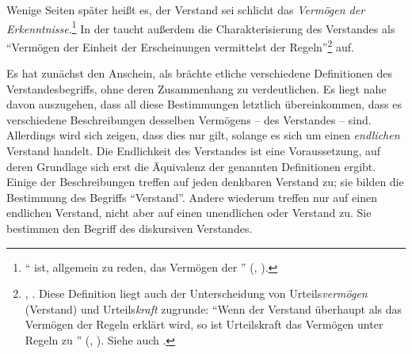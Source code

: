Wenige Seiten später heißt es, der Verstand sei schlicht das
\emph{Vermögen der Erkenntnisse}.\footnote{\enquote{ ist,
allgemein zu reden, das Vermögen der
}
\mkbibparens{\cite[][\S~17]{Kant:KritikderreinenVernunft2003}, \cite[][III:
111.16]{Kant:GesammelteWerke1900ff.}}.}
In der  taucht außerdem die Charakterisierung
des Verstandes als \enquote{Vermögen der Einheit der Erscheinungen vermittelst
der Regeln}\footnote{\cite[][B 359]{Kant:KritikderreinenVernunft2003},
\cite[][III: 239.27--28]{Kant:GesammelteWerke1900ff.}.
Diese Definition liegt auch der Unterscheidung von Urteils\emph{vermögen}
(Verstand) und Urteils\emph{kraft} zugrunde:
\enquote{Wenn der Verstand überhaupt als das Vermögen der Regeln erklärt wird,
so ist Urteilskraft das Vermögen unter Regeln zu }
\mkbibparens{\cite[][B 171]{Kant:KritikderreinenVernunft2003}, \cite[][III:
131.13--14]{Kant:GesammelteWerke1900ff.}}. Siehe auch \cite[][B 197f., 356, A
126f.,]{Kant:KritikderreinenVernunft2003} \cite[][III:
146.6--12, 238.8--11, IV: 92.29--30]{Kant:GesammelteWerke1900ff.}.} auf.


Es hat zunächst den Anschein, als brächte  etliche
verschiedene Definitionen des Verstandesbegriffs, ohne deren Zusammenhang zu
verdeutlichen. Es liegt nahe davon auszugehen, dass all diese
Bestimmungen letztlich übereinkommen, dass es verschiedene
Beschreibungen desselben Vermögens -- des Verstandes -- sind. 
Allerdings wird sich zeigen, dass dies nur gilt, solange es sich um einen
\emph{endlichen} Verstand handelt. Die Endlichkeit des Verstandes ist eine
Voraussetzung, auf deren Grundlage sich erst die Äquivalenz der
genannten Definitionen ergibt. Einige der Beschreibungen treffen auf
jeden denkbaren Verstand zu; sie bilden die Bestimmung des Begriffs
\enquote{Verstand}. Andere wiederum treffen nur auf einen endlichen
Verstand, nicht aber auf einen unendlichen oder
 Verstand zu. Sie bestimmen den Begriff des
diskursiven Verstandes.

